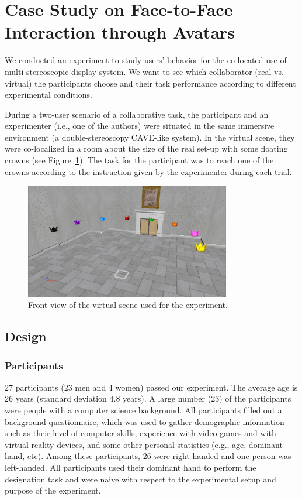 \section{Case Study on Face-to-Face Interaction through Avatars}
We conducted an experiment to study users' behavior for the co-located use of multi-stereoscopic display system. We want to see which collaborator (real vs. virtual) the participants choose and their task performance according to different experimental conditions.

During a two-user scenario of a collaborative task, the participant and an experimenter (i.e., one of the authors) were situated in the same immersive environment (a double-stereoscopy CAVE-like system). In the virtual scene, they were co-localized in a room about the size of the real set-up with some floating crowns (see Figure~\ref{fig:2_virtual_room}). The task for the participant was to reach one of the crowns according to the instruction given by the experimenter during each trial.

\begin{figure}[tb]
  \centering
  \includegraphics[width=0.8\textwidth]{figures/ch2/virtual_room}
  \caption{\label{fig:2_virtual_room}Front view of the virtual scene used for the experiment.}
\end{figure}

\subsection{Design}
\subsubsection{Participants}
27 participants (23 men and 4 women) passed our experiment. The average age is 26 years (standard deviation 4.8 years).
A large number (23) of the participants were people with a computer science background. All participants filled out a background questionnaire, which was used to gather demographic information such as their level of computer skills, experience with video games and with virtual reality devices, and some other personal statistics (e.g., age, dominant hand, etc). Among these participants, 26 were right-handed and one person was left-handed. All participants used their dominant hand to perform the designation task and were naive with respect to the experimental setup and purpose of the experiment.

